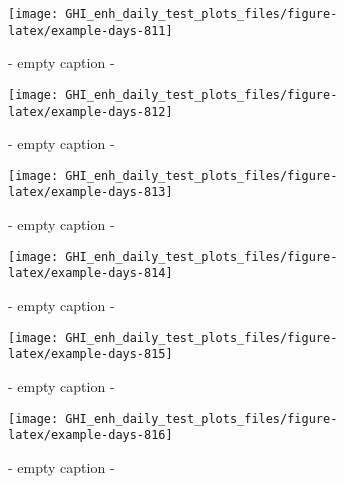 \documentclass[
  10pt,
  a4paper,oneside]{article}
\begin{document}
\begin{figure}[H]

{\centering \texttt{[image: GHI\_enh\_daily\_test\_plots\_files/figure-latex/example-days-811]} 

}

\caption{ - empty caption - }\label{fig:example-days-811}
\end{figure}

\begin{figure}[H]

{\centering \texttt{[image: GHI\_enh\_daily\_test\_plots\_files/figure-latex/example-days-812]} 

}

\caption{ - empty caption - }\label{fig:example-days-812}
\end{figure}

\begin{figure}[H]

{\centering \texttt{[image: GHI\_enh\_daily\_test\_plots\_files/figure-latex/example-days-813]} 

}

\caption{ - empty caption - }\label{fig:example-days-813}
\end{figure}

\begin{figure}[H]

{\centering \texttt{[image: GHI\_enh\_daily\_test\_plots\_files/figure-latex/example-days-814]} 

}

\caption{ - empty caption - }\label{fig:example-days-814}
\end{figure}

\begin{figure}[H]

{\centering \texttt{[image: GHI\_enh\_daily\_test\_plots\_files/figure-latex/example-days-815]} 

}

\caption{ - empty caption - }\label{fig:example-days-815}
\end{figure}

\begin{figure}[H]

{\centering \texttt{[image: GHI\_enh\_daily\_test\_plots\_files/figure-latex/example-days-816]} 

}

\caption{ - empty caption - }\label{fig:example-days-816}
\end{figure}
\end{document}
